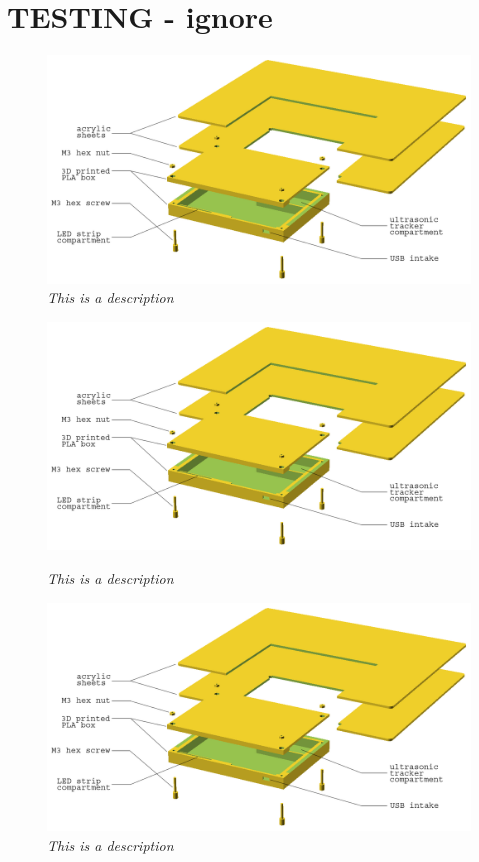 \section{TESTING - ignore}

\begin{figure}[h]
\begin{center}
\includegraphics[scale=0.5]{figures/explode.png}
\caption{\small {\it {This is a description}}} \label{fig:testfig0}
\end{center}
\end{figure}


\begin{figure}[h]
\begin{minipage}[b]{7.5cm}
\centering
\includegraphics[scale=0.20]{figures/explode.png}
\caption{\small {\it {This is a description}}} \label{fig:testfig1}
\end{minipage}
\hspace{0.5cm}
\begin{minipage}[b]{7.5cm}
\centering
\includegraphics[scale=0.20]{figures/explode.png}
\caption{\small {\it {This is a description}}} \label{fig:testfig2}
\end{minipage}
\end{figure}


